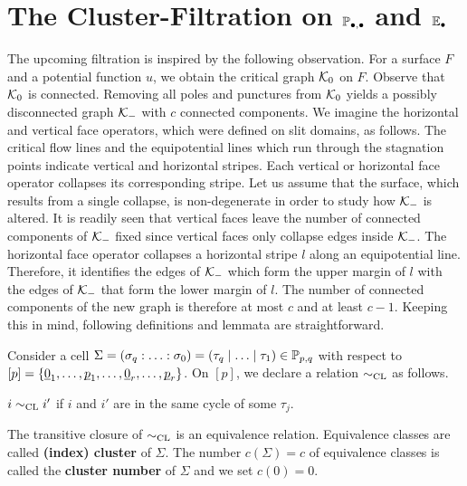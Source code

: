 \section{The Cluster-Filtration on \texorpdfstring{$\mathbb P_{\bullet, \bullet}$}{P} and \texorpdfstring{$\mathbb E_\bullet$}{E}}
The upcoming filtration is inspired by the following observation.
For a surface $F$ and a potential function $u$, we obtain the critical graph $\mathcal{K}_0$ on $F$.
Observe that $\mathcal{K}_0$ is connected.
Removing all poles and punctures from $\mathcal{K}_0$ yields a possibly disconnected graph $\mathcal{K}_-$ with $c$ connected components.
We imagine the horizontal and vertical face operators, which were defined on slit domains, as follows.
The critical flow lines and the equipotential lines which run through the stagnation points indicate vertical and horizontal stripes.
Each vertical or horizontal face operator collapses its corresponding stripe.
Let us assume that the surface, which results from a single collapse, is non-degenerate in order to study how $\mathcal{K}_-$ is altered.
It is readily seen that vertical faces leave the number of connected components of $\mathcal{K}_-$ fixed since vertical faces only collapse edges inside $\mathcal{K}_-$.
The horizontal face operator collapses a horizontal stripe $l$ along an equipotential line.
Therefore, it identifies the edges of $\mathcal{K}_-$ which form the upper margin of $l$ with the edges of $\mathcal{K}_-$ that form the lower margin of $l$.
The number of connected components of the new graph is therefore at most $c$ and at least $c-1$.
Keeping this in mind, following definitions and lemmata are straightforward.
\begin{defi}
    \label{css:cluster_relation}
    Consider a cell $ \Sigma = \homogq = \inhomq \in \PP_{p,q}$ with respect to $[p] = \{ \ul0_1, \ldots, \ul p_1, \ldots, \ul 0_r, \ldots, \ul p_r\}$. 
    On $[p]$, we declare a relation $\sim_{\mathrm{CL}}$ as follows.
    \begin{center}
        $i \sim_{\mathrm{CL}} i'$ \hspace{10pt} if \hspace{10pt} $i$ and $i'$ are in the same cycle of some $\tau_j$. 
    \end{center}
    The transitive closure of $\sim_{\mathrm{CL}}$ is an equivalence relation.
    Equivalence classes are called {\bfseries (index) cluster} of $\Sigma$.
    The number $c(\Sigma) = c$ of equivalence classes is called the {\bfseries cluster number} of $\Sigma$ and we set $c(0) = 0$. 
\end{defi}

